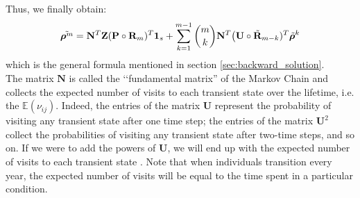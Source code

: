 \documentclass[\main/main.tex]{subfiles}
\begin{document}
Thus, we finally obtain:
\begin{equation}
     \Tilde{\bm{\rho}^m} = \mathbf{N}^T\mathbf{Z} (\mathbf{P} \circ \mathbf{R}_m)^T \bm{1}_s + \sum_{k=1}^{m-1} \binom{m}{k} \mathbf{N}^T \big( \mathbf{U} \circ \Tilde{\mathbf{R}}_{m-k})^T  \Tilde{\bm{\rho}}^k 
\end{equation}
which is the general formula mentioned in section \ref{sec:backward_solution}.\\

The matrix $\mathbf{N}$ is called the \lq\lq fundamental matrix'' of the Markov Chain and collects the expected number of visits to each transient state over the lifetime, i.e. the $\mathds{E} (\nu_{ij})$.  
Indeed, the entries of the matrix $\mathbf{U}$ represent the probability of
visiting any transient state after one time step; the entries of the matrix $\mathbf{U}^2$ collect the probabilities of visiting any transient state after two-time steps, and so on. If we were to add the powers of $\mathbf{U}$, we will end up with the expected number of visits to each transient state \citep{Caswell2009}. Note that when individuals transition every year, the expected number of visits will be equal to the time spent in a particular condition.\\
\end{document}
